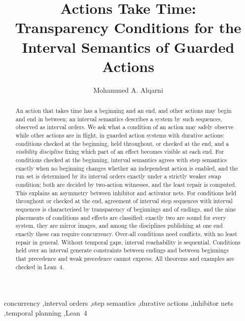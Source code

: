 \documentclass[preprint,12pt]{elsarticle}
\theoremstyle{plain}
\theoremstyle{definition}
\begin{document}
\begin{frontmatter}

\title{Actions Take Time:\\ Transparency Conditions for the Interval Semantics of Guarded Actions}

\author{Mohammed A. Alqarni}
\address{Department of Software Engineering, University of Jeddah, Jeddah, Saudi Arabia}

\begin{abstract}
An action that takes time has a beginning and an end, and other actions may begin and end in between; an interval semantics describes a system by such sequences, observed as interval orders. We ask what a condition of an action may safely observe while other actions are in flight, in guarded action systems with durative actions: conditions checked at the beginning, held throughout, or checked at the end, and a \emph{visibility discipline} fixing which part of an effect becomes visible at each end. For conditions checked at the beginning, interval semantics agrees with step semantics exactly when no beginning changes whether an independent action is enabled, and the run set is determined by its interval orders exactly under a strictly weaker swap condition; both are decided by two-action witnesses, and the least repair is computed. This explains an asymmetry between inhibitor and activator nets. For conditions held throughout or checked at the end, agreement of interval step sequences with interval sequences is characterised by transparency of beginnings and of endings, and the nine placements of conditions and effects are classified: exactly two are sound for every system, they are mirror images, and among the disciplines publishing at one end exactly these can require concurrency. Over-all conditions need conflicts, with no least repair in general. Without temporal gaps, interval reachability is sequential. Conditions held over an interval generate constraints between endings and between beginnings that precedence and weak precedence cannot express. All theorems and examples are checked in Lean~4.
\end{abstract}

\begin{keyword}
concurrency \sep interval orders \sep step semantics \sep durative actions \sep inhibitor nets \sep temporal planning \sep Lean~4
\end{keyword}

\end{frontmatter}
\end{document}
